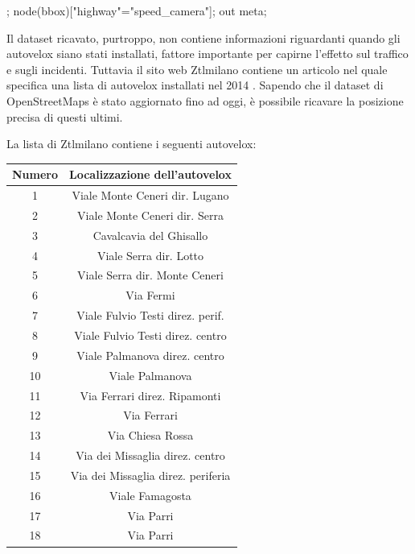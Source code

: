 \documentclass[a4paper]{report}
\begin{document}
\begin{code}
;
node({{bbox}})["highway"="speed_camera"];
out meta;
\end{code}

Il dataset ricavato, purtroppo, non contiene informazioni riguardanti quando gli 
autovelox siano stati installati, fattore importante per capirne l'effetto 
sul traffico e sugli incidenti. 
Tuttavia il sito web Ztlmilano 
contiene un articolo nel quale specifica una lista di 
autovelox installati nel 2014 \cite{ZTLMILANO:1}. 
Sapendo che il dataset di OpenStreetMaps è stato aggiornato fino ad oggi, 
è possibile ricavare la posizione precisa di questi ultimi. 

La lista di Ztlmilano contiene i seguenti autovelox: 

\begin{center}
    \def\arraystretch{1.5}%
    \begin{tabular}{ |c|c| } 
    \hline
    Numero & Localizzazione dell'autovelox \\ 
    \hline
    \rowcolor{TableGray}
    1   &   Viale Monte Ceneri  dir. Lugano\\
    2   &   Viale Monte Ceneri dir. Serra\\
    \rowcolor{TableGray}
    3   &   Cavalcavia del Ghisallo\\
    4   &   Viale Serra dir. Lotto\\
    \rowcolor{TableGray}
    5   &   Viale Serra dir. Monte Ceneri\\
    6   &   Via Fermi\\
    \rowcolor{TableGray}
    7   &   Viale Fulvio Testi direz. perif.\\
    8   &   Viale Fulvio Testi direz. centro\\
    \rowcolor{TableGray}
    9   &   Viale Palmanova  direz. centro\\
    10  &   Viale Palmanova\\
    \rowcolor{TableGray}
    11  &   Via Ferrari direz. Ripamonti\\
    12  &   Via Ferrari\\
    \rowcolor{TableGray}
    13  &   Via Chiesa Rossa\\
    14  &   Via dei Missaglia direz. centro\\
    \rowcolor{TableGray}
    15  &   Via dei Missaglia direz. periferia\\
    16  &   Viale Famagosta\\
    \rowcolor{TableGray}
    17  &   Via Parri\\
    18  &   Via Parri\\
    \hline
    \end{tabular}
    \label{ztl-milano}
\end{center}
\end{document}
